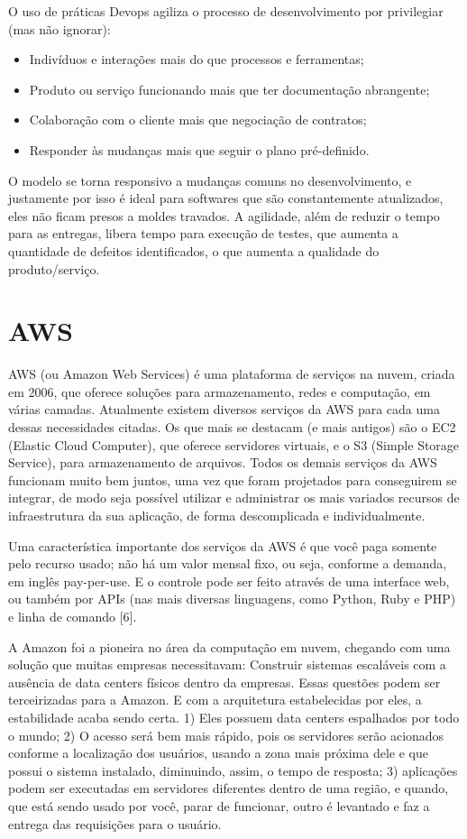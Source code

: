 O uso de práticas Devops agiliza o processo de desenvolvimento por privilegiar (mas não ignorar):

\begin{itemize}
   \item Indivíduos e interações mais do que processos e ferramentas;
   \item Produto ou serviço funcionando mais que ter documentação abrangente;
   \item Colaboração com o cliente mais que negociação de contratos;
   \item Responder às mudanças mais que seguir o plano pré-definido.
\end{itemize}

O modelo se torna responsivo a mudanças comuns no desenvolvimento, e justamente por isso é ideal para softwares que são constantemente atualizados, eles não ficam presos a moldes travados. A agilidade, além de reduzir o tempo para as entregas, libera tempo para execução de testes, que aumenta a quantidade de defeitos identificados, o que aumenta a qualidade do produto/serviço.

\section{AWS}

AWS (ou Amazon Web Services) é uma plataforma de serviços na nuvem, criada em 2006, que oferece soluções para armazenamento, redes e computação, em várias camadas. Atualmente existem diversos serviços da AWS para cada uma dessas necessidades citadas. Os que mais se destacam (e mais antigos) são o EC2 (Elastic Cloud Computer), que oferece servidores virtuais, e o S3 (Simple Storage Service), para armazenamento de arquivos. Todos os demais serviços da AWS funcionam muito bem juntos, uma vez que foram projetados para conseguirem se integrar, de modo seja possível utilizar e administrar os mais variados recursos de infraestrutura da sua aplicação, de forma descomplicada e individualmente.

Uma característica importante dos serviços da AWS é que você paga somente pelo recurso usado; não há um valor mensal fixo, ou seja, conforme a demanda, em inglês pay-per-use. E o controle pode ser feito através de uma interface web, ou também por APIs (nas mais diversas linguagens, como Python, Ruby e PHP) e linha de comando [6].

A Amazon foi a pioneira no área da computação em nuvem, chegando com uma solução que muitas empresas necessitavam: Construir sistemas escaláveis com a ausência de data centers físicos dentro da empresas. Essas questões podem ser terceirizadas para a Amazon. E com a arquitetura estabelecidas por eles, a estabilidade acaba sendo certa. 1) Eles possuem data centers espalhados por todo o mundo; 2) O acesso será bem mais rápido, pois os servidores serão acionados conforme a localização dos usuários, usando a zona mais próxima dele e que possui o sistema instalado, diminuindo, assim, o tempo de resposta; 3) aplicações podem ser executadas em servidores diferentes dentro de uma região, e quando, que está sendo usado por você, parar de funcionar, outro é levantado e faz a entrega das requisições para o usuário.


